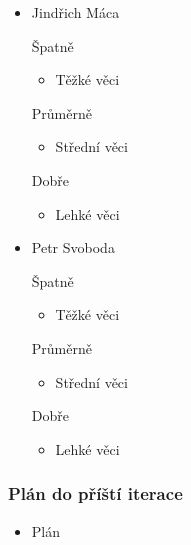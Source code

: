 \documentclass{beamer}
\begin{document}
\begin{frame}[allowframebreaks]
\begin{itemize}
    \item Jindřich Máca
      \begin{block}{Špatně} %
       \begin{itemize}
        \item Těžké věci
       \end{itemize}
     \end{block}
     \begin{block}{Průměrně} %
        \begin{itemize}
        \item Střední věci
       \end{itemize}
     \end{block}
     \begin{block}{Dobře} %
       \begin{itemize}
        \item Lehké věci
       \end{itemize}
     \end{block}
   
    \item Petr Svoboda
      \begin{block}{Špatně} %
       \begin{itemize}
        \item Těžké věci
       \end{itemize}
     \end{block}
     \begin{block}{Průměrně} %
        \begin{itemize}
        \item Střední věci
       \end{itemize}
     \end{block}
     \begin{block}{Dobře} %
       \begin{itemize}
        \item Lehké věci
       \end{itemize}
     \end{block}
   \end{itemize}
\end{frame}

\begin{frame}[allowframebreaks]\frametitle{Plán do příští iterace}
  \begin{itemize}
    \item Plán
  \end{itemize}
\end{frame}
\end{document}
